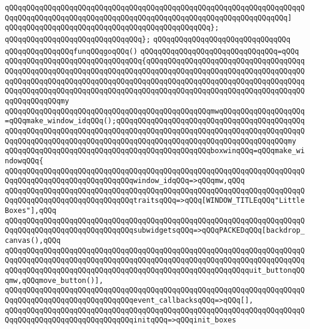 \verb|qQQqqQQqqQQqqQQqqQQqqQQqqQQqqQQqqQQqqQQqqQQqqQQqqQQqqQQqqQQqqQQqqQQqqQQqqQQqqQQqqQQqqQQqqQQqqQQqqQQqqQQqqQQqqQQqqQQqqQQqqQQqqQQqqQQqqQQq]|\newline
\verb|qQQqqQQqqQQqqQQqqQQqqQQqqQQqqQQqqQQqqQQqqQQqqQQq};|\newline
\verb|qQQqqQQqqQQqqQQqqQQqqQQqqQQqqQQq};|\newline
\verb|qQQqqQQqqQQqqQQqqQQqqQQqqQQqqQQq|\newline
\newline
\verb|qQQqqQQqqQQqqQQqfunqQQqgoqQQq()|\newline
\verb|qQQqqQQqqQQqqQQqqQQqqQQqqQQqqQQq=qQQq|\newline
\verb|qQQqqQQqqQQqqQQqqQQqqQQqqQQqqQQq{qQQqqQQqqQQqqQQqqQQqqQQqqQQqqQQqqQQqqQQqqQQqqQQqqQQqqQQqqQQqqQQqqQQqqQQqqQQqqQQqqQQqqQQqqQQqqQQqqQQqqQQqqQQqqQQqqQQqqQQqqQQqqQQqqQQqqQQqqQQqqQQqqQQqqQQqqQQqqQQqqQQqqQQqqQQqqQQqqQQqqQQqqQQqqQQqqQQqqQQqqQQqqQQqqQQqqQQqqQQqqQQqqQQqqQQqqQQqqQQqqQQqqQQqqQQqqQQqqQQqmy|\newline
\verb|qQQqqQQqqQQqqQQqqQQqqQQqqQQqqQQqqQQqqQQqqQQqqQQqmwqQQqqQQqqQQqqQQqqQQq=qQQqmake_window_idqQQq();qQQqqQQqqQQqqQQqqQQqqQQqqQQqqQQqqQQqqQQqqQQqqQQqqQQqqQQqqQQqqQQqqQQqqQQqqQQqqQQqqQQqqQQqqQQqqQQqqQQqqQQqqQQqqQQqqQQqqQQqqQQqqQQqqQQqqQQqqQQqqQQqqQQqqQQqqQQqqQQqqQQqqQQqqQQqqQQqqQQqmy|\newline
\verb|qQQqqQQqqQQqqQQqqQQqqQQqqQQqqQQqqQQqqQQqqQQqqQQqboxwinqQQq=qQQqmake_windowqQQq{|\newline
\verb|qQQqqQQqqQQqqQQqqQQqqQQqqQQqqQQqqQQqqQQqqQQqqQQqqQQqqQQqqQQqqQQqqQQqqQQqqQQqqQQqqQQqqQQqqQQqqQQqqQQqwindow_idqQQq=>qQQqmw,qQQq|\newline
\verb|qQQqqQQqqQQqqQQqqQQqqQQqqQQqqQQqqQQqqQQqqQQqqQQqqQQqqQQqqQQqqQQqqQQqqQQqqQQqqQQqqQQqqQQqqQQqqQQqqQQqtraitsqQQq=>qQQq[WINDOW_TITLEqQQq"LittleBoxes"],qQQq|\newline
\verb|qQQqqQQqqQQqqQQqqQQqqQQqqQQqqQQqqQQqqQQqqQQqqQQqqQQqqQQqqQQqqQQqqQQqqQQqqQQqqQQqqQQqqQQqqQQqqQQqqQQqsubwidgetsqQQq=>qQQqPACKEDqQQq[backdrop_canvas(),qQQq|\newline
\verb|qQQqqQQqqQQqqQQqqQQqqQQqqQQqqQQqqQQqqQQqqQQqqQQqqQQqqQQqqQQqqQQqqQQqqQQqqQQqqQQqqQQqqQQqqQQqqQQqqQQqqQQqqQQqqQQqqQQqqQQqqQQqqQQqqQQqqQQqqQQqqQQqqQQqqQQqqQQqqQQqqQQqqQQqqQQqqQQqqQQqqQQqqQQqqQQqqQQqquit_buttonqQQqmw,qQQqmove_button()],|\newline
\verb|qQQqqQQqqQQqqQQqqQQqqQQqqQQqqQQqqQQqqQQqqQQqqQQqqQQqqQQqqQQqqQQqqQQqqQQqqQQqqQQqqQQqqQQqqQQqqQQqqQQqevent_callbacksqQQq=>qQQq[],|\newline
\verb|qQQqqQQqqQQqqQQqqQQqqQQqqQQqqQQqqQQqqQQqqQQqqQQqqQQqqQQqqQQqqQQqqQQqqQQqqQQqqQQqqQQqqQQqqQQqqQQqqQQqinitqQQq=>qQQqinit_boxes|\newline
